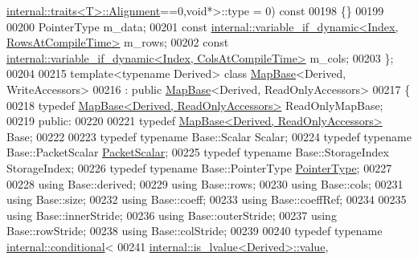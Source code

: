 \begin{DoxyCode}
      \hyperlink{struct_eigen_1_1internal_1_1traits}{internal::traits<T>::Alignment}==0,\textcolor{keywordtype}{void}*>::type = 0)\textcolor{keyword}{ const}
00198 \textcolor{keyword}{    }\{\}
00199 
00200     PointerType m\_data;
00201     \textcolor{keyword}{const} \hyperlink{class_eigen_1_1internal_1_1variable__if__dynamic}{internal::variable\_if\_dynamic<Index, RowsAtCompileTime>}
       m\_rows;
00202     \textcolor{keyword}{const} \hyperlink{class_eigen_1_1internal_1_1variable__if__dynamic}{internal::variable\_if\_dynamic<Index, ColsAtCompileTime>}
       m\_cols;
00203 \};
00204 
00215 \textcolor{keyword}{template}<\textcolor{keyword}{typename} Derived> \textcolor{keyword}{class }\hyperlink{class_eigen_1_1_map_base}{MapBase}<Derived, WriteAccessors>
00216   : \textcolor{keyword}{public} \hyperlink{class_eigen_1_1_map_base}{MapBase}<Derived, ReadOnlyAccessors>
00217 \{
00218     \textcolor{keyword}{typedef} \hyperlink{group___core___module_class_eigen_1_1_map_base_3_01_derived_00_01_read_only_accessors_01_4}{MapBase<Derived, ReadOnlyAccessors>} ReadOnlyMapBase;
00219   \textcolor{keyword}{public}:
00220 
00221     \textcolor{keyword}{typedef} \hyperlink{group___core___module_class_eigen_1_1_map_base_3_01_derived_00_01_read_only_accessors_01_4}{MapBase<Derived, ReadOnlyAccessors>} Base;
00222 
00223     \textcolor{keyword}{typedef} \textcolor{keyword}{typename} Base::Scalar Scalar;
00224     \textcolor{keyword}{typedef} \textcolor{keyword}{typename} Base::PacketScalar \hyperlink{group___sparse_core___module}{PacketScalar};
00225     \textcolor{keyword}{typedef} \textcolor{keyword}{typename} Base::StorageIndex StorageIndex;
00226     \textcolor{keyword}{typedef} \textcolor{keyword}{typename} Base::PointerType \hyperlink{class_eigen_1_1internal_1_1_tensor_lazy_evaluator_writable}{PointerType};
00227 
00228     \textcolor{keyword}{using} Base::derived;
00229     \textcolor{keyword}{using} Base::rows;
00230     \textcolor{keyword}{using} Base::cols;
00231     \textcolor{keyword}{using} Base::size;
00232     \textcolor{keyword}{using} Base::coeff;
00233     \textcolor{keyword}{using} Base::coeffRef;
00234 
00235     \textcolor{keyword}{using} Base::innerStride;
00236     \textcolor{keyword}{using} Base::outerStride;
00237     \textcolor{keyword}{using} Base::rowStride;
00238     \textcolor{keyword}{using} Base::colStride;
00239 
00240     \textcolor{keyword}{typedef} \textcolor{keyword}{typename} \hyperlink{struct_eigen_1_1internal_1_1conditional}{internal::conditional}<
00241                     \hyperlink{struct_eigen_1_1internal_1_1is__lvalue}{internal::is\_lvalue<Derived>::value},

\end{DoxyCode}
